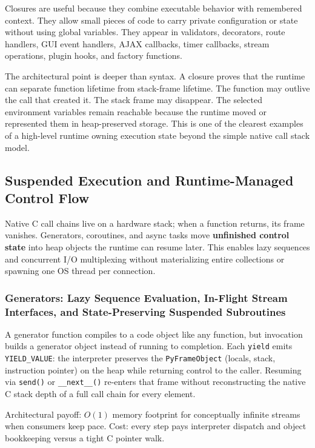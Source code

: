 \documentclass[a4paper,twoside]{report}
\begin{document}
Closures are useful because they combine executable behavior with remembered context. They allow small pieces of code to carry private configuration or state without using global variables. They appear in validators, decorators, route handlers, GUI event handlers, AJAX callbacks, timer callbacks, stream operations, plugin hooks, and factory functions.

The architectural point is deeper than syntax. A closure proves that the runtime can separate function lifetime from stack-frame lifetime. The function may outlive the call that created it. The stack frame may disappear. The selected environment variables remain reachable because the runtime moved or represented them in heap-preserved storage. This is one of the clearest examples of a high-level runtime owning execution state beyond the simple native call stack model.




\subsection{Suspended Execution and Runtime-Managed Control Flow}

Native C call chains live on a hardware stack; when a function returns, its frame vanishes. Generators, coroutines, and async tasks move \textbf{unfinished control state} into heap objects the runtime can resume later. This enables lazy sequences and concurrent I/O multiplexing without materializing entire collections or spawning one OS thread per connection.

\subsubsection{Generators: Lazy Sequence Evaluation, In-Flight Stream Interfaces, and State-Preserving Suspended Subroutines}

A generator function compiles to a code object like any function, but invocation builds a generator object instead of running to completion. Each \texttt{yield} emits \texttt{YIELD\_VALUE}: the interpreter preserves the \texttt{PyFrameObject} (locals, stack, instruction pointer) on the heap while returning control to the caller. Resuming via \texttt{send()} or \texttt{\_\_next\_\_()} re-enters that frame without reconstructing the native C stack depth of a full call chain for every element.

Architectural payoff: $O(1)$ memory footprint for conceptually infinite streams when consumers keep pace. Cost: every step pays interpreter dispatch and object bookkeeping versus a tight C pointer walk.
\end{document}
